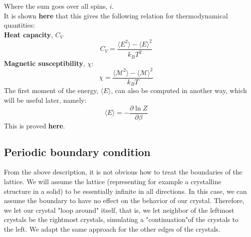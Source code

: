 \documentclass[a4paper, 10pt]{article}
\begin{document}
Where the sum goes over all spins, $i$.\\
\linebreak
It is shown \textbf{here} that this  gives the following relation for thermodynamical quantities:\\
\textbf{Heat capacity}, $C_V$\\
\begin{equation}\label{eq:heat_capacity}
C_V=\frac{\langle E^2\rangle - \langle E \rangle^2}{k_BT^2}
\end{equation}
\textbf{Magnetic susceptibility}, $\chi$:
\begin{equation}\label{eq:magnetic_susp}
\chi=\frac{\langle \mathcal{M}^2\rangle - \langle \mathcal{M} \rangle^2}{k_BT}
\end{equation}
The first moment of the energy, $\langle E \rangle$, can also be computed in another way, which will be useful later, namely:
\begin{equation}
\langle E \rangle = -\frac{\partial \ln Z}{\partial \beta}
\end{equation}
This is proved \textbf{here}.
\subsection{Periodic boundary condition}
From the above description, it is not obvious how to treat the boundaries of the lattice. We will assume the  lattice (representing for example a crystalline structure in a solid) to be essentially infinite in all directions. In this case, we can assume the boundary to have no effect on the behavior of our crystal. Therefore, we let our crystal "loop around" itself, that is, we let neighbor of the leftmost crystals be the rightmost crystals, simulating a "continuation"of the crystals to the left. We adapt the same approach for the other edges of the crystals.
\end{document}
